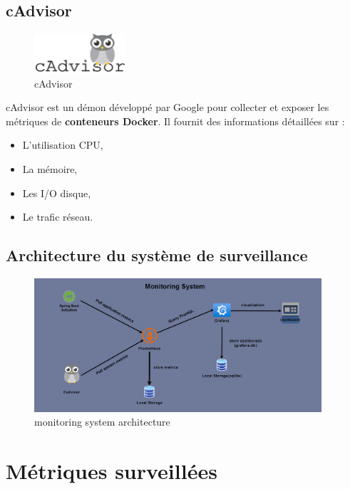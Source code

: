\subsection{cAdvisor}
\begin{figure}[H]
\centering
\includegraphics[width=0.3\textwidth]{images/cadvisor.png}
\caption{cAdvisor}
\label{fig:architecture-overview}
\end{figure}
cAdvisor est un démon développé par Google pour collecter et exposer les métriques de \textbf{conteneurs Docker}. Il fournit des informations détaillées sur :
\begin{itemize}
    \item  L’utilisation CPU,
    \item  La mémoire,
    \item  Les I/O disque,
    \item  Le trafic réseau.
\end{itemize}

\subsection{Architecture du système de surveillance}
\begin{figure}[H]
\centering
\includegraphics[width=0.95\textwidth]{images/monitoring.png}
\caption{monitoring system architecture}
\label{fig:architecture-overview}
\end{figure}

\section{Métriques surveillées}

